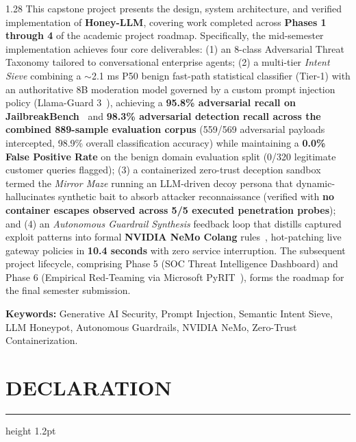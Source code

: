 \documentclass[12pt,a4paper,oneside]{report}
\begin{document}
\begin{spacing}{1.28}
This capstone project presents the design, system architecture, and verified implementation of \textbf{Honey-LLM}, covering work completed across \textbf{Phases 1 through 4} of the academic project roadmap. Specifically, the mid-semester implementation achieves four core deliverables: (1) an 8-class Adversarial Threat Taxonomy tailored to conversational enterprise agents; (2) a multi-tier \textit{Intent Sieve} combining a $\sim$2.1 ms P50 benign fast-path statistical classifier (Tier-1) with an authoritative 8B moderation model governed by a custom prompt injection policy (Llama-Guard 3~\cite{llamaguard3}), achieving a \textbf{95.8\% adversarial recall on JailbreakBench~\cite{jailbreakbench2024}} and \textbf{98.3\% adversarial detection recall across the combined 889-sample evaluation corpus} (559/569 adversarial payloads intercepted, 98.9\% overall classification accuracy) while maintaining a \textbf{0.0\% False Positive Rate} on the benign domain evaluation split (0/320 legitimate customer queries flagged); (3) a containerized zero-trust deception sandbox termed the \textit{Mirror Maze} running an LLM-driven decoy persona that dynamic-hallucinates synthetic bait to absorb attacker reconnaissance (verified with \textbf{no container escapes observed across 5/5 executed penetration probes}); and (4) an \textit{Autonomous Guardrail Synthesis} feedback loop that distills captured exploit patterns into formal \textbf{NVIDIA NeMo Colang} rules~\cite{nemo2024guardrails}, hot-patching live gateway policies in \textbf{10.4 seconds} with zero service interruption. The subsequent project lifecycle, comprising Phase 5 (SOC Threat Intelligence Dashboard) and Phase 6 (Empirical Red-Teaming via Microsoft PyRIT~\cite{pyrit2024}), forms the roadmap for the final semester submission.

\vspace{0.08in}
\noindent\textbf{Keywords:} Generative AI Security, Prompt Injection, Semantic Intent Sieve, LLM Honeypot, Autonomous Guardrails, NVIDIA NeMo, Zero-Trust Containerization.
\end{spacing}

\newpage

\chapter*{DECLARATION}
\hrule height 1.2pt
\vspace{0.15in}
\end{document}
